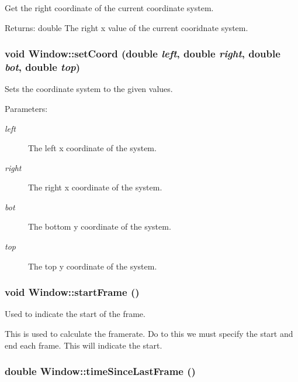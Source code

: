 Get the right coordinate of the current coordinate system. 

\begin{Desc}
\item[Returns:]double The right x value of the current cooridnate system. \end{Desc}
\hypertarget{class_window_06c6909e28c6d0e40fd1cdd8114292cf}{
\subsubsection[{setCoord}]{\setlength{\rightskip}{0pt plus 5cm}void Window::setCoord (double {\em left}, \/  double {\em right}, \/  double {\em bot}, \/  double {\em top})}}
\label{class_window_06c6909e28c6d0e40fd1cdd8114292cf}


Sets the coordinate system to the given values. 

\begin{Desc}
\item[Parameters:]
\begin{description}
\item[{\em left}]The left x coordinate of the system. \item[{\em right}]The right x coordinate of the system. \item[{\em bot}]The bottom y coordinate of the system. \item[{\em top}]The top y coordinate of the system. \end{description}
\end{Desc}
\hypertarget{class_window_b42a6aea2a574f89b62f9d3064aa06cb}{
\subsubsection[{startFrame}]{\setlength{\rightskip}{0pt plus 5cm}void Window::startFrame ()}}
\label{class_window_b42a6aea2a574f89b62f9d3064aa06cb}


Used to indicate the start of the frame. 

This is used to calculate the framerate. Do to this we must specify the start and end each frame. This will indicate the start. \hypertarget{class_window_1eb98466f580a9137b4dad6ff85443de}{
\subsubsection[{timeSinceLastFrame}]{\setlength{\rightskip}{0pt plus 5cm}double Window::timeSinceLastFrame ()}}
\label{class_window_1eb98466f580a9137b4dad6ff85443de}


